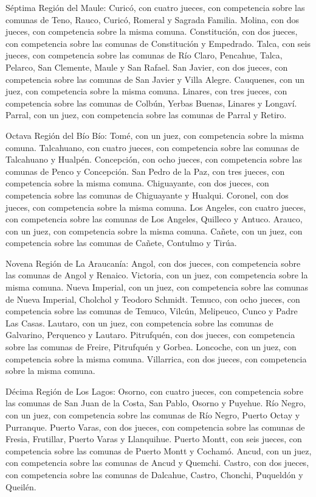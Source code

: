     Séptima Región del Maule:
    Curicó, con cuatro jueces, con competencia sobre las comunas de Teno, Rauco, Curicó, Romeral y Sagrada Familia.
    Molina, con dos jueces, con competencia sobre la misma comuna.
    Constitución, con dos jueces, con competencia sobre las comunas de Constitución y Empedrado.
    Talca, con seis jueces, con competencia sobre las comunas de Río Claro, Pencahue, Talca, Pelarco, San Clemente, Maule y San Rafael.
    San Javier, con dos jueces, con competencia sobre las comunas de San Javier y Villa Alegre.
    Cauquenes, con un juez, con competencia sobre la misma comuna.
    Linares, con tres jueces, con competencia sobre las comunas de Colbún, Yerbas Buenas, Linares y Longaví.
    Parral, con un juez, con competencia sobre las comunas de Parral y Retiro.

    Octava Región del Bío Bío:
    Tomé, con un juez, con competencia sobre la misma comuna.
    Talcahuano, con cuatro jueces, con competencia sobre las comunas de Talcahuano y Hualpén.
    Concepción, con ocho jueces, con competencia sobre las comunas de Penco y Concepción.
    San Pedro de la Paz, con tres jueces, con competencia sobre la misma comuna.
    Chiguayante, con dos jueces, con competencia sobre las comunas de Chiguayante y Hualqui.
    Coronel, con dos jueces, con competencia sobre la misma comuna.
    Los Angeles, con cuatro jueces, con competencia sobre las comunas de Los Angeles, Quilleco y Antuco.
    Arauco, con un juez, con competencia sobre la misma comuna.
    Cañete, con un juez, con competencia sobre las comunas de Cañete, Contulmo y Tirúa.

    Novena Región de La Araucanía:
    Angol, con dos jueces, con competencia sobre las comunas de Angol y Renaico.
    Victoria, con un juez, con competencia sobre la misma comuna.
    Nueva Imperial, con un juez, con competencia sobre las comunas de Nueva Imperial, Cholchol y Teodoro Schmidt.
    Temuco, con ocho jueces, con competencia sobre las comunas de Temuco, Vilcún, Melipeuco, Cunco y Padre Las Casas.
    Lautaro, con un juez, con competencia sobre las comunas de Galvarino, Perquenco y Lautaro.
    Pitrufquén, con dos jueces, con competencia sobre las comunas de Freire, Pitrufquén y Gorbea.
    Loncoche, con un juez, con competencia sobre la misma comuna.
    Villarrica, con dos jueces, con competencia sobre la misma comuna.

    Décima Región de Los Lagos:
    Osorno, con cuatro jueces, con competencia sobre las comunas de San Juan de la Costa, San Pablo, Osorno y Puyehue.
    Río Negro, con un juez, con competencia sobre las comunas de Río Negro, Puerto Octay y Purranque.
    Puerto Varas, con dos jueces, con competencia sobre las comunas de Fresia, Frutillar, Puerto Varas y Llanquihue.
    Puerto Montt, con seis jueces, con competencia sobre las comunas de Puerto Montt y Cochamó.
    Ancud, con un juez, con competencia sobre las comunas de Ancud y Quemchi.
    Castro, con dos jueces, con competencia sobre las comunas de Dalcahue, Castro, Chonchi, Puqueldón y Queilén.

